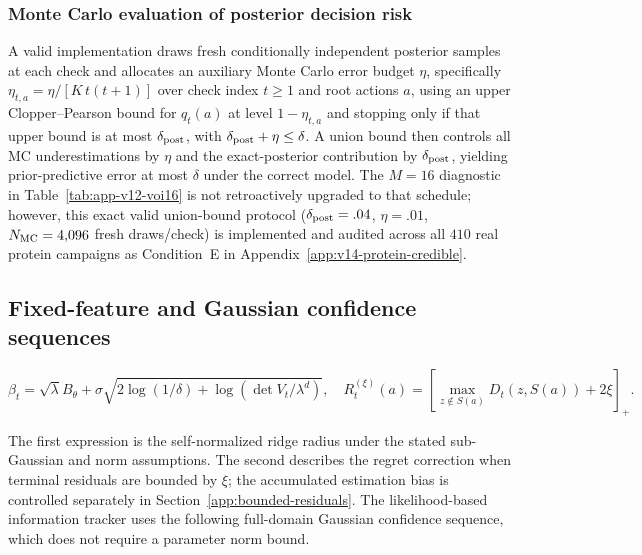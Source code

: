 \documentclass{article}
\theoremstyle{plain}
\theoremstyle{definition}
\begin{document}
\subsubsection{Monte Carlo evaluation of posterior decision risk}

A valid implementation draws fresh conditionally independent posterior samples at each check and allocates an auxiliary Monte Carlo error budget $\eta$, specifically $\eta_{t,a}=\eta/[K\,t(t+1)]$ over check index $t\ge1$ and root actions $a$, using an upper Clopper--Pearson bound for $q_t(a)$ at level $1-\eta_{t,a}$ and stopping only if that upper bound is at most $\delta_{\rm post}$, with $\delta_{\rm post}+\eta\le\delta$. A union bound then controls all MC underestimations by $\eta$ and the exact-posterior contribution by $\delta_{\rm post}$, yielding prior-predictive error at most $\delta$ under the correct model. The $M=16$ diagnostic in Table~\ref{tab:app-v12-voi16} is not retroactively upgraded to that schedule; however, this exact valid union-bound protocol ($\delta_{\rm post}=.04$, $\eta=.01$, $N_{\rm MC}=4{,}096$ fresh draws/check) is implemented and audited across all $410$ real protein campaigns as Condition~E in Appendix~\ref{app:v14-protein-credible}.

\subsection{Fixed-feature and Gaussian confidence sequences}
\label{app:fixed-feature-coverage}

\begin{equation}
 \beta_t=\sqrt\lambda B_\theta+\sigma\sqrt{2\log(1/\delta)+\log(\det V_t/\lambda^d)},\quad
 R_t^{(\xi)}(a)=[\max_{z\notin S(a)}D_t(z,S(a))+2\xi]_+.
 \label{eq:ay-radius}
\end{equation}

The first expression is the self-normalized ridge radius under the stated sub-Gaussian and norm assumptions. The second describes the regret correction when terminal residuals are bounded by $\xi$; the accumulated estimation bias is controlled separately in Section~\ref{app:bounded-residuals}. The likelihood-based information tracker uses the following full-domain Gaussian confidence sequence, which does not require a parameter norm bound.
\end{document}
